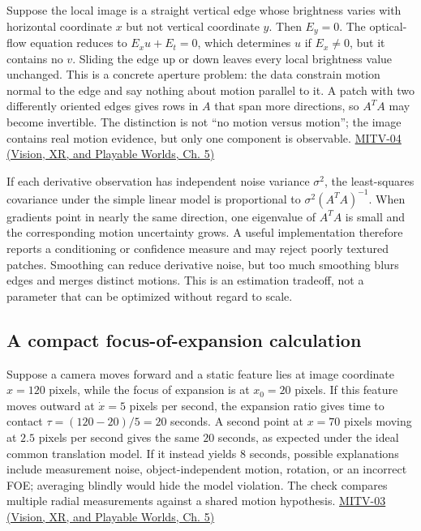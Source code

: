 \hypertarget{04-visual-computing-ii-ch030-flow-why-one-bright-edge-cannot-reveal-full-motion}{}

Suppose the local image is a straight vertical edge whose brightness varies with horizontal coordinate \(x\) but not vertical coordinate \(y\). Then \(E_y=0\). The optical-flow equation reduces to \(E_xu+E_t=0\), which determines \(u\) if \(E_x\ne0\), but it contains no \(v\). Sliding the edge up or down leaves every local brightness value unchanged. This is a concrete aperture problem: the data constrain motion normal to the edge and say nothing about motion parallel to it. A patch with two differently oriented edges gives rows in \(A\) that span more directions, so \(A^TA\) may become invertible. The distinction is not ``no motion versus motion''; the image contains real motion evidence, but only one component is observable. \href{../07-Vision-XR-and-Playable-Worlds/main.pdf\#nameddest=04-visual-computing-ii-ch036-mitv-04---fixed-optical-flow-optical-mouse-constant-brightness-assumption-closed-form-solution}{MITV-04 (Vision, XR, and Playable Worlds, Ch. 5)}

If each derivative observation has independent noise variance \(\sigma^2\), the least-squares covariance under the simple linear model is proportional to \(\sigma^2(A^TA)^{-1}\). When gradients point in nearly the same direction, one eigenvalue of \(A^TA\) is small and the corresponding motion uncertainty grows. A useful implementation therefore reports a conditioning or confidence measure and may reject poorly textured patches. Smoothing can reduce derivative noise, but too much smoothing blurs edges and merges distinct motions. This is an estimation tradeoff, not a parameter that can be optimized without regard to scale.

\subsection{A compact focus-of-expansion calculation}\label{04-visual-computing-ii-ch030-a-compact-focus-of-expansion-calculation}

\hypertarget{04-visual-computing-ii-ch030-a-compact-focus-of-expansion-calculation}{}

Suppose a camera moves forward and a static feature lies at image coordinate \(x=120\) pixels, while the focus of expansion is at \(x_0=20\) pixels. If this feature moves outward at \(\dot x=5\) pixels per second, the expansion ratio gives time to contact \(\tau=(120-20)/5=20\) seconds. A second point at \(x=70\) pixels moving at \(2.5\) pixels per second gives the same \(20\) seconds, as expected under the ideal common translation model. If it instead yields \(8\) seconds, possible explanations include measurement noise, object-independent motion, rotation, or an incorrect FOE; averaging blindly would hide the model violation. The check compares multiple radial measurements against a shared motion hypothesis. \href{../07-Vision-XR-and-Playable-Worlds/main.pdf\#nameddest=04-visual-computing-ii-ch036-mitv-03---time-to-contact-focus-of-expansion-direct-motion-vision-methods-noise-gain}{MITV-03 (Vision, XR, and Playable Worlds, Ch. 5)}

